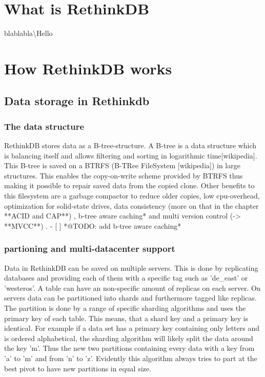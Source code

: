 \section{What is RethinkDB}

blablabla\textbackslash{}Hello

\section{How RethinkDB works}

\subsection{Data storage in Rethinkdb}

\subsubsection{The data structure}

RethinkDB stores data as a B-tree-structure. A B-tree is a data structure which is balancing itself and allows filtering and sorting in logarithmic time[wikipedia]. This B-tree is saved on a BTRFS (B-TRee FileSystem [wikipedia]) in large structures. This enables the copy-on-write scheme provided by BTRFS thus making it possible to repair saved data from the copied clone. Other benefits to this filesystem are a garbage compactor to reduce older copies, low cpu-overhead, optimization for solid-state drives, data consistency (more on that in the chapter **ACID and CAP**) , b-tree aware caching* and multi version control (-> **MVCC**) .
- [ ] *@TODO: add b-tree aware caching*

\subsubsection{partioning and multi-datacenter support}

Data in RethinkDB can be saved on multiple servers. This is done by replicating databases and providing each of them with a specific tag such as 'de\_east' or 'westeros'. A table can have an non-specific amount of replicas on each server. 
On servers data can be partitioned into shards and furthermore tagged like replicas.  The partition is done by a range of specific sharding algorithms and uses the primary key of each table. This means, that a shard key and a primary key is identical. For example if a data set has a primary key containing only letters and is ordered alphabetical, the sharding algorithm will likely split the data around the key 'm'. Thus the new two partitions containing every data with a key from 'a' to 'm' and from 'n' to 'z'. Evidently this algorithm always tries to part at the best pivot to have new partitions in equal size.


